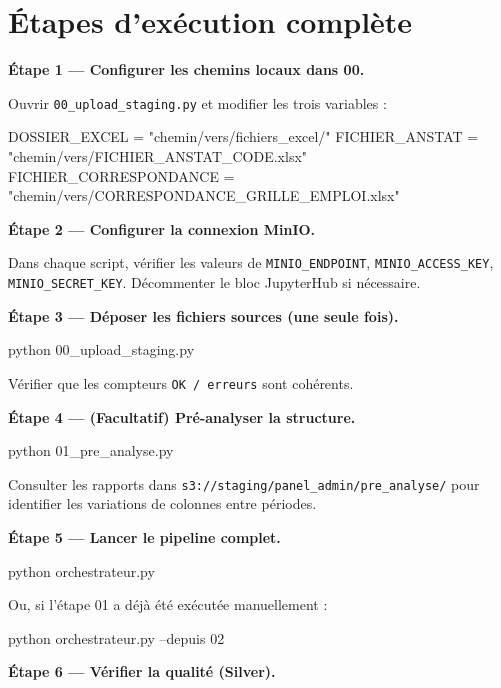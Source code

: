 \documentclass[12pt,a4paper,french]{report}
\newcommand{\bucket}[1]{\texttt{s3://#1}}
\begin{document}
\section{Étapes d'exécution complète}

\textbf{Étape 1 --- Configurer les chemins locaux dans 00.}

Ouvrir \texttt{00\_upload\_staging.py} et modifier les trois variables :

\begin{codebox}[]
DOSSIER\_EXCEL          = "chemin/vers/fichiers\_excel/"
FICHIER\_ANSTAT         = "chemin/vers/FICHIER\_ANSTAT\_CODE.xlsx"
FICHIER\_CORRESPONDANCE = "chemin/vers/CORRESPONDANCE\_GRILLE\_EMPLOI.xlsx"
\end{codebox}

\textbf{Étape 2 --- Configurer la connexion MinIO.}

Dans chaque script, vérifier les valeurs de \texttt{MINIO\_ENDPOINT},
\texttt{MINIO\_ACCESS\_KEY}, \texttt{MINIO\_SECRET\_KEY}. Décommenter le
bloc JupyterHub si nécessaire.

\textbf{Étape 3 --- Déposer les fichiers sources (une seule fois).}

\begin{codebox}[]
python 00\_upload\_staging.py
\end{codebox}

Vérifier que les compteurs \texttt{OK / erreurs} sont cohérents.

\textbf{Étape 4 --- (Facultatif) Pré-analyser la structure.}

\begin{codebox}[]
python 01\_pre\_analyse.py
\end{codebox}

Consulter les rapports dans \bucket{staging/panel\_admin/pre\_analyse/}
pour identifier les variations de colonnes entre périodes.

\textbf{Étape 5 --- Lancer le pipeline complet.}

\begin{codebox}[]
python orchestrateur.py
\end{codebox}

Ou, si l'étape 01 a déjà été exécutée manuellement :

\begin{codebox}[]
python orchestrateur.py --depuis 02
\end{codebox}

\textbf{Étape 6 --- Vérifier la qualité (Silver).}
\end{document}
